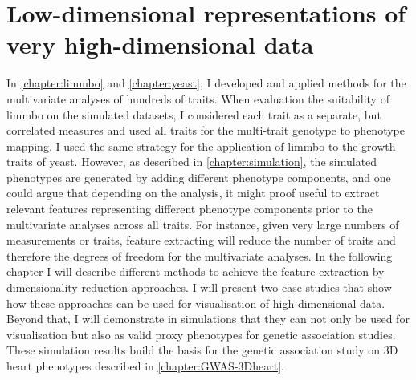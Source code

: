 \chapter{Low-dimensional representations of very high-dimensional data}
\label{chapter:DimReduction}
In \cref{chapter:limmbo} and \cref{chapter:yeast}, I developed and applied methods for the multivariate analyses of hundreds of traits. When evaluation the suitability of \gls{limmbo} on the simulated datasets, I considered each trait as a separate, but correlated measures and used all traits for the multi-trait genotype to phenotype mapping. I used the same strategy for the application of \gls{limmbo} to the growth traits of yeast. However, as described in \cref{chapter:simulation}, the simulated phenotypes are generated by adding different phenotype components, and one could argue that depending on the analysis, it might proof useful to extract relevant features representing different phenotype components prior to the multivariate analyses across all traits. For instance, given very large numbers of measurements or traits, feature extracting will reduce the number of traits and therefore the degrees of freedom for the multivariate analyses. In the following chapter I will describe different methods to achieve the feature extraction by dimensionality reduction approaches. I will present two case studies that show how these approaches can be used for visualisation of high-dimensional data. Beyond that, I will demonstrate in simulations that they can not only be used for visualisation but also as valid proxy phenotypes for genetic association studies. These simulation results build the basis for the genetic association study on 3D heart phenotypes described in \cref{chapter:GWAS-3Dheart}. 

